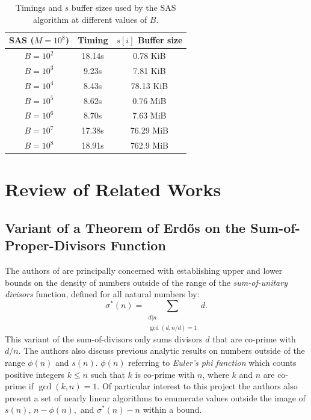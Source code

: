 \documentclass{article}
\theoremstyle{definition}
\begin{document}
\begin{table}[H]
    \centering
    \begin{tabular}{| c | c | c |}
        \hline
        SAS ($M = 10^8$)   &    Timing   &  $s[i]$ Buffer size \\ 
        \hline
        $B = 10^2$  &   18.14s    &  0.78 KiB  \\
        $B = 10^3$   &   9.23s    &  7.81 KiB  \\
        $B = 10^4$   &   8.43s    &  78.13 KiB  \\
        $B = 10^5$   &   8.62s    &  0.76 MiB  \\
        $B = 10^6$   &   8.70s    &  7.63 MiB  \\
        $B = 10^7$   &   17.38s    &  76.29 MiB  \\
        $B = 10^8$   &   18.91s    &  762.9 MiB  \\
        \hline
    \end{tabular}
    \caption{Timings and $s$ buffer sizes used by the SAS algorithm at different values of $B$.}
    \label{tab:SAStuning}
\end{table}


\section{Review of Related Works}
%
\subsection{Variant of a Theorem of Erdős on the Sum-of-Proper-Divisors Function}
\label{sec:pomyang}
The authors of \cite{pomYang} are principally concerned with establishing upper and lower bounds on the density of numbers outside of the range of the \textit{sum-of-unitary divisors} function, defined for all natural numbers by: 
$$\sigma^*(n) = \sum_{\substack{d | n \\ \gcd(d,n/d) = 1}} d.$$
This variant of the sum-of-divisors only sums divisors $d$ that are co-prime with $d/n$. The authors also discuss previous analytic results on numbers outside of the range $\phi(n)$ and $s(n)$.   $\phi(n)$ referring to \textit{Euler's phi function} which counts positive integers $k \leq n$ such that $k$ is co-prime with $n$, where $k$ and $n$ are co-prime if $\gcd(k, n) = 1$. Of particular interest to this project the authors also present a set of nearly linear algorithms to enumerate values outside the image of $s(n)$, $n - \phi(n),$ and $\sigma^*(n) - n$ within a bound.
\end{document}
